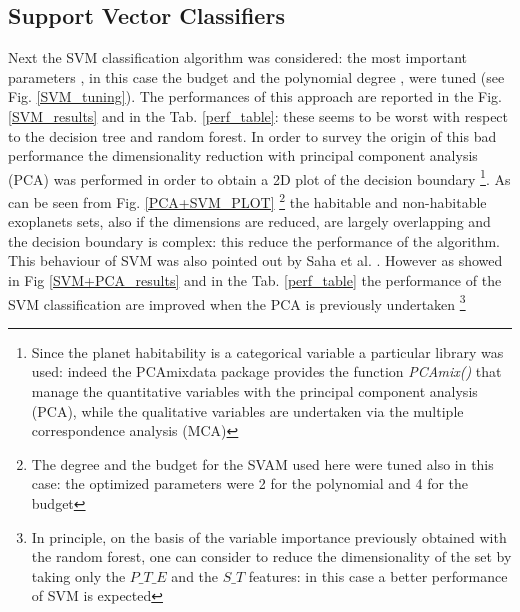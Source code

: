 \documentclass[
12pt, %
a4paper, %
oneside, %
headinclude,footinclude, %
BCOR5mm, %
]{scrartcl}
\begin{document}
\subsection{Support Vector Classifiers}
Next the SVM classification algorithm was considered: the most important parameters , in this case the budget and the polynomial degree , were tuned (see Fig. \ref{SVM_tuning}). The performances of this approach are reported in the Fig. \ref{SVM_results} and in the Tab. \ref{perf_table}: these seems to be worst with respect to the decision tree and random forest. In order to survey the origin of this bad performance the dimensionality reduction with principal component analysis (PCA) was performed in order to obtain a 2D plot of the decision boundary \footnote{Since the planet habitability is a categorical variable a particular library was used: indeed the PCAmixdata package provides the function \textit{PCAmix()} that manage the quantitative variables with the principal component analysis (PCA), while the qualitative variables are undertaken via the multiple correspondence analysis (MCA)}. As can be seen from Fig. \ref{PCA+SVM_PLOT} \footnote{The degree and the budget for the SVAM used here  were tuned also in this case: the optimized parameters were 2 for the polynomial and 4 for the budget} the habitable and non-habitable exoplanets sets, also if the dimensions are reduced, are largely overlapping and the decision boundary is complex: this reduce the performance of the algorithm. This behaviour of SVM was also pointed out by Saha et al. \cite{saha2018machine}. However as showed in Fig \ref{SVM+PCA_results} and in the Tab. \ref{perf_table} the performance of the SVM classification are improved when the PCA is previously undertaken \footnote{In principle, on the basis of the variable importance previously obtained with the random forest, one can consider to reduce the dimensionality of the set by taking only the $P\_T\_E$ and the $S\_T$ features: in this case a better performance of SVM is expected}
\end{document}
